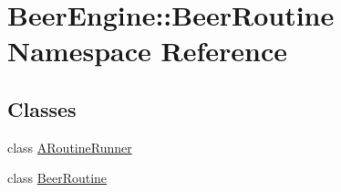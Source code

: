 \hypertarget{namespace_beer_engine_1_1_beer_routine}{}\section{Beer\+Engine\+:\+:Beer\+Routine Namespace Reference}
\label{namespace_beer_engine_1_1_beer_routine}
\subsection*{Classes}
\begin{DoxyCompactItemize}
\item 
class \mbox{\hyperlink{class_beer_engine_1_1_beer_routine_1_1_a_routine_runner}{A\+Routine\+Runner}}
\item 
class \mbox{\hyperlink{class_beer_engine_1_1_beer_routine_1_1_beer_routine}{Beer\+Routine}}
\end{DoxyCompactItemize}
